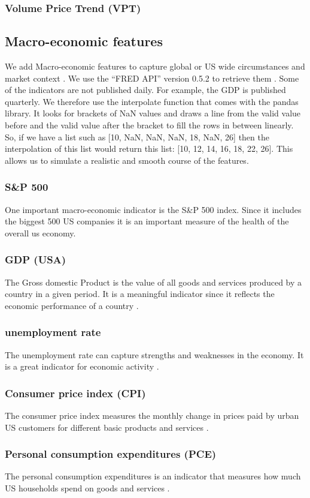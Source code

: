 \documentclass[a4paper,12pt]{report}
\begin{document}
			\subsubsection{Volume Price Trend (VPT)}
		\subsection{Macro-economic features}
		We add Macro-economic features to capture global or US wide circumstances and market context \cite{38}. We use the “FRED API” version 0.5.2 to retrieve them \cite{37}. Some of the indicators are not published daily. For example, the GDP is published quarterly. We therefore use the interpolate function that comes with the pandas library. It looks for brackets of NaN values and draws a line from the valid value before and the valid value after the bracket to fill the rows in between linearly. So, if we have a list such as [10, NaN, NaN, NaN, 18, NaN, 26] then the interpolation of this list would return this list: [10, 12, 14, 16, 18, 22, 26]. This allows us to simulate a realistic and smooth course of the features.
			\subsubsection{S\&P 500}
			One important macro-economic indicator is the S\&P 500 index. Since it includes the biggest 500 US companies it is an important measure of the health of the overall us economy.
			\subsubsection{GDP (USA)}
			The Gross domestic Product is the value of all goods and services produced by a country in a given period. It is a meaningful indicator since it reflects the economic performance of a country \cite{38}.
			\subsubsection{unemployment rate}
			The unemployment rate can capture strengths and weaknesses in the economy. It is a great indicator for economic activity \cite{38}.
			\subsubsection{Consumer price index (CPI)}
			The consumer price index measures the monthly change in prices paid by urban US customers for different basic products and services \cite{39}.
			\subsubsection{Personal consumption expenditures (PCE)}
			The personal consumption expenditures is an indicator that measures how much US households spend on goods and services \cite{41}.
\end{document}
